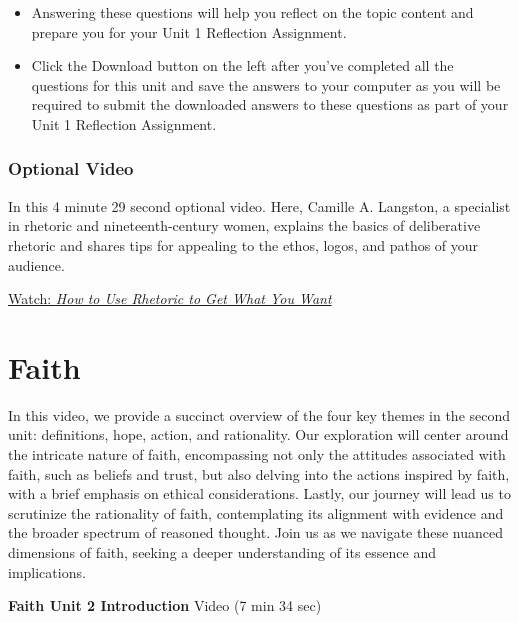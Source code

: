 \documentclass[
]{book}
\providecommand{\tightlist}{%
  \setlength{\itemsep}{0pt}\setlength{\parskip}{0pt}}
\begin{document}
\begin{reflect}
\begin{itemize}
\tightlist
\item
  Answering these questions will help you reflect on the topic content and prepare you for your Unit 1 Reflection Assignment.
\item
  Click the Download button on the left after you've completed all the questions for this unit and save the answers to your computer as you will be required to submit the downloaded answers to these questions as part of your Unit 1 Reflection Assignment.
\end{itemize}
\end{reflect}

\hypertarget{optional-video-3}{%
\subsection*{Optional Video}\label{optional-video-3}}

\begin{reflect}
In this 4 minute 29 second optional video. Here, Camille A. Langston, a specialist in rhetoric and nineteenth-century women, explains the basics of deliberative rhetoric and shares tips for appealing to the ethos, logos, and pathos of your audience.

\href{https://www.youtube.com/watch?v=3klMM9BkW5o}{Watch: \emph{How to Use Rhetoric to Get What You Want}}
\end{reflect}

\hypertarget{faith}{%
\chapter{Faith}\label{faith}}

In this video, we provide a succinct overview of the four key themes in the second unit: definitions, hope, action, and rationality. Our exploration will center around the intricate nature of faith, encompassing not only the attitudes associated with faith, such as beliefs and trust, but also delving into the actions inspired by faith, with a brief emphasis on ethical considerations. Lastly, our journey will lead us to scrutinize the rationality of faith, contemplating its alignment with evidence and the broader spectrum of reasoned thought. Join us as we navigate these nuanced dimensions of faith, seeking a deeper understanding of its essence and implications.

\textbf{Faith Unit 2 Introduction} Video (7 min 34 sec)
\end{document}
